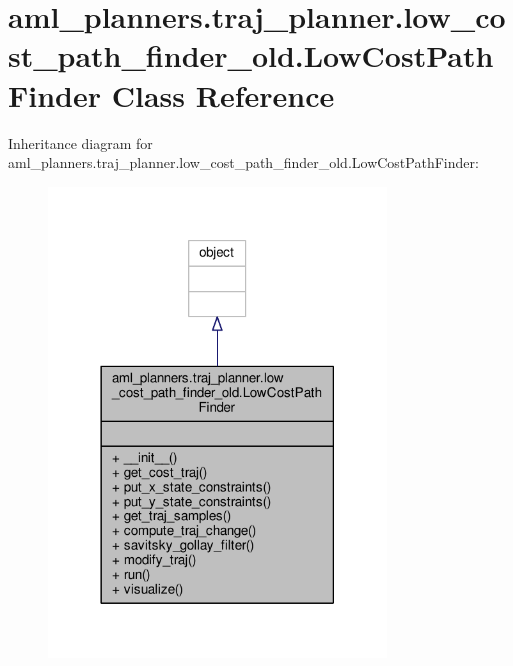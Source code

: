 \hypertarget{classaml__planners_1_1traj__planner_1_1low__cost__path__finder__old_1_1_low_cost_path_finder}{\section{aml\-\_\-planners.\-traj\-\_\-planner.\-low\-\_\-cost\-\_\-path\-\_\-finder\-\_\-old.\-Low\-Cost\-Path\-Finder Class Reference}
\label{classaml__planners_1_1traj__planner_1_1low__cost__path__finder__old_1_1_low_cost_path_finder}
}


Inheritance diagram for aml\-\_\-planners.\-traj\-\_\-planner.\-low\-\_\-cost\-\_\-path\-\_\-finder\-\_\-old.\-Low\-Cost\-Path\-Finder\-:
\nopagebreak
\begin{figure}[H]
\begin{center}
\leavevmode
\includegraphics[width=254pt]{classaml__planners_1_1traj__planner_1_1low__cost__path__finder__old_1_1_low_cost_path_finder__inherit__graph}
\end{center}
\end{figure}


